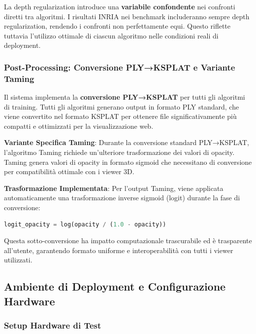 \begin{tcolorbox}[colback=orange!10,colframe=orange!50,title=Importante: Variabile Confondente nei Confronti]
	La depth regularization introduce una \textbf{variabile confondente} nei confronti diretti tra algoritmi. I risultati INRIA nei benchmark includeranno sempre depth regularization, rendendo i confronti non perfettamente equi. Questo riflette tuttavia l'utilizzo ottimale di ciascun algoritmo nelle condizioni reali di deployment.
\end{tcolorbox}

\subsubsection{Post-Processing: Conversione PLY→KSPLAT e Variante Taming}

Il sistema implementa la \textbf{conversione PLY→KSPLAT} per tutti gli algoritmi di training. Tutti gli algoritmi generano output in formato PLY standard, che viene convertito nel formato KSPLAT per ottenere file significativamente più compatti e ottimizzati per la visualizzazione web.

\textbf{Variante Specifica Taming}: Durante la conversione standard PLY→KSPLAT, l'algoritmo Taming richiede un'ulteriore trasformazione dei valori di opacity. Taming genera valori di opacity in formato sigmoid che necessitano di conversione per compatibilità ottimale con i viewer 3D.

\textbf{Trasformazione Implementata}: Per l'output Taming, viene applicata automaticamente una trasformazione inverse sigmoid (logit) durante la fase di conversione:
\begin{lstlisting}[language=Python, caption=Conversione opacity per Taming]
	logit_opacity = log(opacity / (1.0 - opacity))
\end{lstlisting}

Questa sotto-conversione ha impatto computazionale trascurabile ed è trasparente all'utente, garantendo formato uniforme e interoperabilità con tutti i viewer utilizzati.
\subsection{Ambiente di Deployment e Configurazione Hardware}
\label{subsec:ambiente_deployment}

\subsubsection{Setup Hardware di Test}

